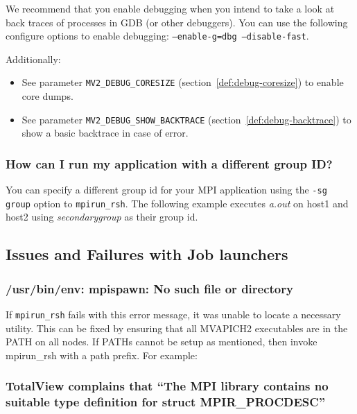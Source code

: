 We recommend that you enable debugging when you intend to take a look at
back traces of processes in GDB (or other debuggers). You can use the
following configure options to enable debugging:
\texttt{--enable-g=dbg --disable-fast}.

Additionally:
\begin{itemize}
\item See parameter \texttt{MV2\_DEBUG\_CORESIZE} (section~\ref{def:debug-coresize}) to enable core dumps.
\item See parameter \texttt{MV2\_DEBUG\_SHOW\_BACKTRACE} (section~\ref{def:debug-backtrace}) to show a basic backtrace in case of error.
\end{itemize}

\subsubsection{How can I run my application with a different group ID?}
\label{subsec:run-alternate_group_id}

You can specify a different group id for your MPI application using the
\texttt{-sg group} option to \texttt{mpirun\_rsh}. The following example
executes \emph{a.out} on host1 and host2 using \emph{secondarygroup} as
their group id.


\subsection{Issues and Failures with Job launchers}

\subsubsection{/usr/bin/env: mpispawn: No such file or directory}

If \texttt{mpirun\_rsh} fails with this error message, it was unable to
locate a necessary utility. This can be fixed by ensuring that all
MVAPICH2 executables are in the PATH on all nodes.  If PATHs cannot be
setup as mentioned, then invoke mpirun\_rsh with a path prefix. For
example:


\subsubsection{TotalView complains that ``The MPI library contains no
suitable type definition for struct MPIR\_PROCDESC''}


